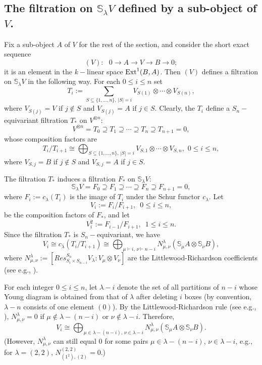 \documentclass{amsart}
\theoremstyle{definition}
\newcommand{\Ext}{\text{\rm Ext}^1}
\newcommand{\ot}{\otimes}
\begin{document}
\subsection{The filtration on $\mathbb{S}_{\lambda}V$ defined by a
sub-object of $V$.} Fix a sub-object $A$ of $V$ for the rest of the
section, and consider the short exact sequence
\begin{equation}\label{exseq}
(V):\,\,\,\,0\xrightarrow{} A\xrightarrow{} V\xrightarrow{}
B\xrightarrow{} 0;
\end{equation}
it is an element in the $k-$linear space $\Ext(B,A)$. Then $(V)$
defines a filtration on $\mathbb{S}_{\lambda}V$ in the following
way. For each $0\le i\le n$ set
$$T_{i}:=\sum_{S\subseteq \{1,...,n\},\,
|S|=i}V_{S(1)}\otimes\cdots\otimes V_{S(n)},$$ where $V_{S(j)}=V$ if
$j\notin S$ and $V_{S(j)}=A$ if $j\in S$. Clearly, the $T_{i}$
define a $S_n-$equivariant filtration $T_*$ on $V^{\otimes n}$:
$$V^{\otimes n}=T_0\supseteq T_1\supseteq\cdots\supseteq T_n\supseteq
T_{n+1}=0,$$ whose composition factors are
$$T_{i}/T_{i+1}\cong\bigoplus_{S\subseteq \{1,...,n\},\,
|S|=i}V_{S,1}\otimes\cdots\otimes V_{S,n},\,\,0\le i\le n,$$ where
$V_{S,j}=B$ if $j\notin S$ and $V_{S,j}=A$ if $j\in S$.

The filtration $T_*$ induces a filtration $F_*$ on
$\mathbb{S}_{\lambda}V$:
$$\mathbb{S}_{\lambda}V=F_0\supseteq F_1\supseteq\cdots\supseteq
F_n\supseteq F_{n+1}=0,$$ where $F_{i}:=c_{\lambda}(T_{i})$ is the
image of $T_{i}$ under the Schur functor $c_{\lambda}$. Let
\begin{equation}\label{vi}
V_{i}:=F_{i}/F_{i+1},\,\,\,0\le i\le n,
\end{equation}
be the composition factors of $F_*$, and let
\begin{equation}\label{vi2}
V_{i}^2:=F_{i-1}/F_{i+1},\,\,\,1\le i\le n.
\end{equation}
Since the filtration $T_*$ is $S_n-$equivariant, we have
\begin{equation}\label{vi1}
V_{i}\cong c_{\lambda}\left(T_{i}/T_{i+1}\right)\cong
\bigoplus_{\mu\vdash i,\,\nu\vdash
n-i}N_{\mu,\nu}^{\lambda}(\mathbb{S}_{\mu} A\ot \mathbb{S}_{\nu} B),
\end{equation}
where $N_{\mu,\nu}^{\lambda}:=[Res^{S_{n}}_{S_{i}\times
S_{n-i}}V_{\lambda}:V_{\mu}\ot V_{\nu}]$ are the
Littlewood-Richardson coefficients (see e.g., \cite{fh}).

For each integer $0\le i\le n$, let $\lambda-i$ denote the set of
all partitions of $n-i$ whose Young diagram is obtained from that of
$\lambda$ after deleting $i$ boxes (by convention, $\lambda-n$
consists of one element $(0)$). By the Littlewood-Richardson rule
(see e.g., \cite{fh}), $N_{\mu,\nu}^{\lambda}=0$ if
$\mu\notin\lambda-(n-i)$ or $\nu\notin\lambda-i$. Therefore,
\begin{equation}\label{vi11}
V_{i}\cong \bigoplus_{\mu\in \lambda-(n-i),\,\nu\in
\lambda-i}N_{\mu,\nu}^{\lambda}(\mathbb{S}_{\mu} A\ot
\mathbb{S}_{\nu} B).
\end{equation}
(However, $N_{\mu,\nu}^{\lambda}$ can still equal $0$ for some pairs
$\mu\in\lambda-(n-i)$, $\nu\in\lambda-i$, e.g., for $\lambda=(2,2)$,
$N_{(1^2),(2)}^{(2,2)}=0$.)
\end{document}
